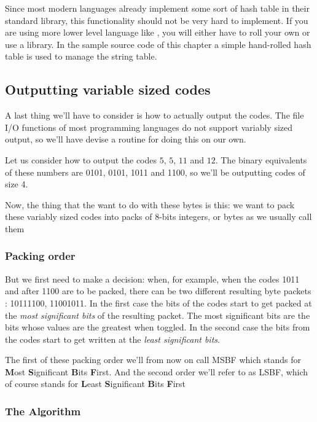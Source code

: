 \begin{refsection}
Since most modern languages already implement some sort of hash table
in their standard library, this functionality should not be very hard
to implement. If you are using more lower level language like \C, you
will either have to roll your own or use a library. In the sample \C
source code of this chapter a simple hand-rolled hash table
is used to manage the string table.

\subsection{Outputting variable sized codes}

A last thing we'll have to consider is how to actually output the
codes. The file I/O functions of most programming languages do not
support variably sized output, so we'll have devise a routine for doing
this on our own.

Let us consider how to output the codes $5$, $5$, $11$ and $12$. The
binary equivalents of these numbers are 0101, 0101,
1011 and 1100, so we'll be outputting codes of size 4.

Now, the thing that the want to do with these bytes is this: we want
to pack these variably sized codes into packs of 8-bits integers, or
bytes as we usually call them

\subsubsection{Packing order}

But we first need to make a decision: when, for example, when the
codes 1011 and after 1100 are to be packed, there can be
two different resulting byte packets : 10111100,
11001011. In the first case the bits of the codes start to get
packed at the \textit{most significant bits} of the resulting packet.
The most significant bits are the bits whose values are the greatest
when toggled. In the second case the bits from the codes start to get
written at the \textit{least significant bits}.

The first of these packing order we'll from now on call
MSBF which stands for \textbf{M}ost \textbf{S}ignificant
\textbf{B}its \textbf{F}irst. And the second order we'll refer to as
LSBF, which of course stands for \textbf{L}east
\textbf{S}ignificant \textbf{B}its \textbf{F}irst

\subsubsection{The Algorithm}


\end{refsection}
